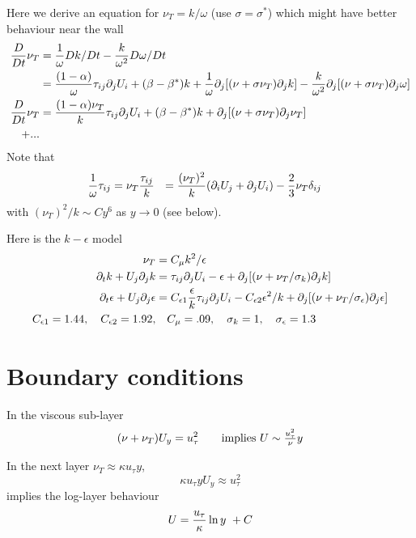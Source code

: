 \documentclass{article}
\begin{document}
Here we derive an equation for $\nu_T=k/\omega$  (use $\sigma=\sigma^*$) which might have better
behaviour near the wall
\begin{align*}
  {D\over Dt} \nu_T &= {1\over\omega} D k/Dt - {k\over\omega^2} D\omega/Dt \\
    &= {(1-\alpha)\over\omega} \tau_{ij} \partial_j U_i + (\beta-\beta^*)k 
     + {1\over\omega} \partial_j[ (\nu+\sigma \nu_T)\partial_j k]
     - {k\over\omega^2} \partial_j[ (\nu+\sigma \nu_T)\partial_j \omega] \\
 {D\over Dt} \nu_T    &= {(1-\alpha) \nu_T \over k} \tau_{ij} \partial_j U_i + (\beta-\beta^*)k 
     + \partial_j[ (\nu+\sigma \nu_T)\partial_j \nu_T] \\
     + ... \\
\end{align*}
Note that 
\begin{align*}
  {1\over\omega} \tau_{ij} &= \nu_T {\tau_{ij}\over k} 
             ~~=  {(\nu_T)^2 \over k} ( \partial_i U_j + \partial_j U_i ) - {2\over3} \nu_T\delta_{ij}
\end{align*}
with $(\nu_T)^2/k \sim C y^6$ as $y\rightarrow 0$ (see below).

Here is the $k-\epsilon$ model
\begin{align*}
   \nu_T &= C_\mu k^2/\epsilon \\
   \partial_t k + U_j\partial_j k & = \tau_{ij} \partial_j U_i -\epsilon
                    + \partial_j[ (\nu+\nu_T/\sigma_k)\partial_j k] \\
    \partial_t \epsilon + U_j\partial_j \epsilon  &= C_{\epsilon 1} {\epsilon\over k}\tau_{ij} \partial_j U_i 
           -C_{\epsilon 2} \epsilon^2/k +  \partial_j[ (\nu+\nu_T/\sigma_\epsilon)\partial_j \epsilon] \\  
   C_{\epsilon 1}=1.44, \quad C_{\epsilon 2}=1.92, &\quad C_\mu = .09, \quad \sigma_k=1, \quad \sigma_\epsilon=1.3
\end{align*}


\section{Boundary conditions}

In the viscous sub-layer
\begin{align*}
   (\nu+\nu_T) U_y &= u_\tau^2 \qquad\mbox{implies $U \sim {u_\tau^2 \over\nu} y$}\\
\end{align*}

In the next layer $\nu_T \approx \kappa u_\tau y$,
\[
   \kappa u_\tau y U_y \approx u_\tau^2 
\]
implies the log-layer behaviour
\[
    U = {u_\tau\over\kappa} \ln y  ~+C
\]
\end{document}

